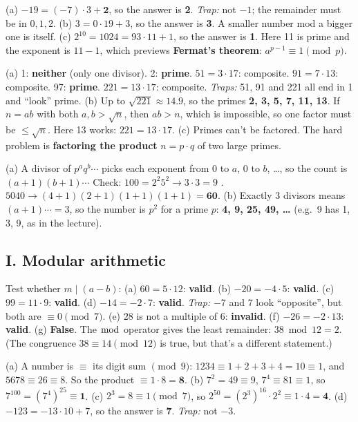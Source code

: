 \ans (a) $-19 = (-7)\cdot 3 + \mathbf{2}$, so the answer is \textbf{2}. \emph{Trap:} not $-1$; the remainder must be in $0, 1, 2$.
(b) $3 = 0 \cdot 19 + 3$, so the answer is \textbf{3}. A smaller number mod a bigger one is itself.
(c) $2^{10} = 1024 = 93 \cdot 11 + 1$, so the answer is \textbf{1}. Here 11 is prime and the exponent is $11 - 1$, which previews \textbf{Fermat's theorem}: $a^{p-1} \equiv 1 \pmod p$.

\ans (a) 1: \textbf{neither} (only one divisor). 2: \textbf{prime}. $51 = 3 \cdot 17$: composite. $91 = 7 \cdot 13$: composite. 97: \textbf{prime}. $221 = 13 \cdot 17$: composite.
\emph{Traps:} 51, 91 and 221 all end in 1 and ``look'' prime.
(b) Up to $\sqrt{221} \approx 14.9$, so the primes \textbf{2, 3, 5, 7, 11, 13}. If $n = ab$ with both $a, b > \sqrt n$, then $ab > n$, which is impossible, so one factor must be $\le \sqrt n$. Here 13 works: $221 = 13 \cdot 17$.
(c) Primes can't be factored. The hard problem is \textbf{factoring the product} $n = p \cdot q$ of two large primes.

\ans (a) A divisor of $p^a q^b \cdots$ picks each exponent from $0$ to $a$, $0$ to $b$, \dots, so the count is $(a+1)(b+1)\cdots$
Check: $100 = 2^2 5^2 \to 3 \cdot 3 = 9$ \checkmark. \;$5040 \to (4+1)(2+1)(1+1)(1+1) = \mathbf{60}$.
(b) Exactly 3 divisors means $(a+1)\cdots = 3$, so the number is $p^2$ for a prime $p$: \textbf{4, 9, 25, 49, \dots} (e.g.\ 9 has 1, 3, 9, as in the lecture).

\subsection*{I. Modular arithmetic}

\ans Test whether $m \mid (a - b)$:
(a) $60 = 5\cdot12$: \textbf{valid}. (b) $-20 = -4\cdot5$: \textbf{valid}. (c) $99 = 11\cdot9$: \textbf{valid}.
(d) $-14 = -2\cdot7$: \textbf{valid}. \emph{Trap:} $-7$ and $7$ look ``opposite'', but both are $\equiv 0 \pmod 7$.
(e) $28$ is not a multiple of 6: \textbf{invalid}. (f) $-26 = -2\cdot13$: \textbf{valid}.
(g) \textbf{False}. The $\bmod$ operator gives the least remainder: $38 \bmod 12 = 2$. (The congruence $38 \equiv 14 \pmod{12}$ is true, but that's a different statement.)

\ans (a) A number is $\equiv$ its digit sum $\pmod 9$: $1234 \equiv 1+2+3+4 = 10 \equiv 1$, and $5678 \equiv 26 \equiv 8$. So the product $\equiv 1 \cdot 8 = \mathbf{8}$.
(b) $7^2 = 49 \equiv 9$, $7^4 \equiv 81 \equiv 1$, so $7^{100} = (7^4)^{25} \equiv \mathbf{1}$.
(c) $2^3 = 8 \equiv 1 \pmod 7$, so $2^{50} = (2^3)^{16}\cdot 2^2 \equiv 1 \cdot 4 = \mathbf{4}$.
(d) $-123 = -13\cdot10 + 7$, so the answer is $\mathbf{7}$. \emph{Trap:} not $-3$.

